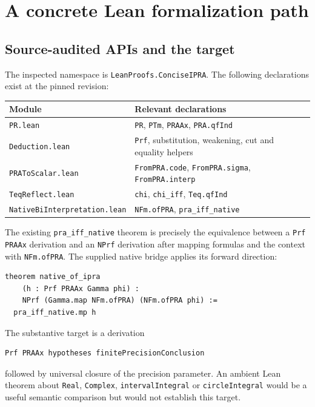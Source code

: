 \documentclass[11pt]{article}
\theoremstyle{definition}
\newcommand{\code}[1]{\texttt{#1}}
\begin{document}
\section{A concrete Lean formalization path}\label{sec:lean}

\subsection{Source-audited APIs and the target}

The inspected namespace is \code{LeanProofs.ConciseIPRA}.
The following declarations exist at the pinned revision:
\begin{center}\small
\begin{tabular}{>{\raggedright\arraybackslash}p{}
                >{\raggedright\arraybackslash}p{}}
\toprule
Module & Relevant declarations\\\midrule
\code{PR.lean} &
\code{PR}, \code{PTm}, \code{PRAAx}, \code{PRA.qfInd}\\
\code{Deduction.lean} &
\code{Prf}, substitution, weakening, cut and equality helpers\\
\code{PRAToScalar.lean} &
\code{FromPRA.code}, \code{FromPRA.sigma}, \code{FromPRA.interp}\\
\code{TeqReflect.lean} &
\code{chi}, \code{chi\_iff}, \code{Teq.qfInd}\\
\code{NativeBiInterpretation.lean} &
\code{NFm.ofPRA}, \code{pra\_iff\_native}\\\bottomrule
\end{tabular}
\end{center}
The existing \code{pra\_iff\_native} theorem is precisely the equivalence
between a \code{Prf PRAAx} derivation and an \code{NPrf} derivation after
mapping formulas and the context with \code{NFm.ofPRA}.
The supplied native bridge applies its forward direction:
\begin{lstlisting}
theorem native_of_ipra
    (h : Prf PRAAx Gamma phi) :
    NPrf (Gamma.map NFm.ofPRA) (NFm.ofPRA phi) :=
  pra_iff_native.mp h
\end{lstlisting}
The substantive target is a derivation
\begin{lstlisting}
Prf PRAAx hypotheses finitePrecisionConclusion
\end{lstlisting}
followed by universal closure of the precision parameter.
An ambient Lean theorem about \code{Real}, \code{Complex},
\code{intervalIntegral} or \code{circleIntegral} would be a useful
semantic comparison but would not establish this target.
\end{document}
